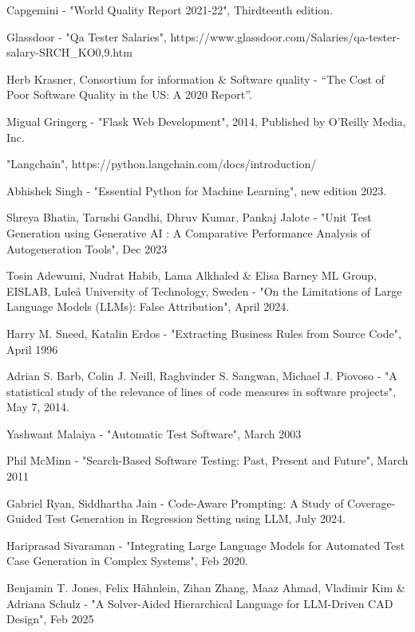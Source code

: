\documentclass[12pt, twoside]{report}
\begin{document}
\begin{thebibliography}{99}

Capgemini - "World Quality Report 2021-22", Thirdteenth edition.

Glassdoor - "Qa Tester Salaries", https://www.glassdoor.com/Salaries/qa-tester-salary-SRCH\_KO0,9.htm 

Herb Krasner, Consortium for information \& Software quality - ``The Cost of Poor Software Quality in the US: A 2020 Report''.

Migual Gringerg - "Flask Web Development", 2014, Published by O'Reilly Media, Inc.

"Langchain", https://python.langchain.com/docs/introduction/ 

Abhishek Singh - "Essential Python for Machine Learning", new edition 2023.

Shreya Bhatia, Tarushi Gandhi, Dhruv Kumar, Pankaj Jalote - "Unit Test Generation using Generative AI : A Comparative Performance Analysis of Autogeneration Tools", Dec 2023

Tosin Adewumi, Nudrat Habib, Lama Alkhaled \& Elisa Barney ML Group, EISLAB, Luleå University of Technology, Sweden - "On the Limitations of Large Language Models (LLMs): False Attribution", April 2024.

Harry M. Sneed, Katalin Erdos - "Extracting Business Rules from Source Code", April 1996

Adrian S. Barb, Colin J. Neill, Raghvinder S. Sangwan, Michael J. Piovoso - "A statistical study of the relevance of lines of code measures in software projects", May 7, 2014.

Yashwant Malaiya - "Automatic Test Software", March 2003

Phil McMinn - "Search-Based Software Testing: Past, Present and Future", March 2011

Gabriel Ryan, Siddhartha Jain - Code-Aware Prompting: A Study of Coverage-Guided Test Generation in Regression Setting using LLM, July 2024.

Hariprasad Sivaraman - "Integrating Large Language Models for Automated Test Case Generation in Complex Systems", Feb 2020.

Benjamin T. Jones, Felix Hähnlein, Zihan Zhang, Maaz Ahmad, Vladimir Kim \& Adriana Schulz - "A Solver-Aided Hierarchical Language for LLM-Driven CAD Design", Feb 2025


\end{thebibliography}
\end{document}
